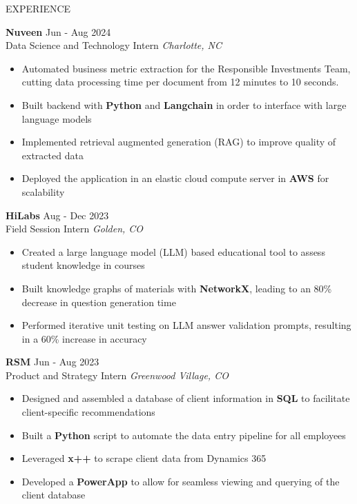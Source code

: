 \documentclass{resume} %
\begin{document}
\begin{rSection}{EXPERIENCE}

\textbf{Nuveen} \hfill Jun - Aug 2024\\
Data Science and Technology Intern \hfill \textit{Charlotte, NC}
\vspace{-6pt}
 \begin{itemize}[leftmargin=*]
    \itemsep -6pt {} 
    \item Automated business metric extraction for the Responsible Investments Team, cutting data processing time per document from 12 minutes to 10 seconds.
    \item Built backend with \textbf{Python} and \textbf{Langchain} in order to interface with large language models
    \item Implemented retrieval augmented generation (RAG) to improve quality of extracted data
    \item Deployed the application in an elastic cloud compute server in \textbf{AWS} for scalability
 \end{itemize}

 \textbf{HiLabs} \hfill Aug - Dec 2023\\
Field Session Intern \hfill \textit{Golden, CO}
\vspace{-6pt}
 \begin{itemize}[leftmargin=*]
    \itemsep -6pt {} 
    \item Created a large language model (LLM) based educational tool to assess student knowledge in courses
    \item Built knowledge graphs of materials with \textbf{NetworkX}, leading to an 80\% decrease in question generation time
    \item Performed iterative unit testing on LLM answer validation prompts, resulting in a 60\% increase in accuracy
 \end{itemize}

\textbf{RSM} \hfill Jun - Aug 2023\\
Product and Strategy Intern \hfill \textit{Greenwood Village, CO}
\vspace{-6pt}
 \begin{itemize}[leftmargin=*]
    \itemsep -6pt {} 
     \item Designed and assembled a database of client information in \textbf{SQL} to facilitate client-specific recommendations 
     \item Built a \textbf{Python} script to automate the data entry pipeline for all employees
     \item Leveraged \textbf{x++} to scrape client data from Dynamics 365
     \item Developed a \textbf{PowerApp} to allow for seamless viewing and querying of the client database
 \end{itemize}

\end{rSection}
 
\end{document}
